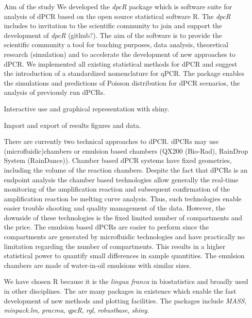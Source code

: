 \documentclass{bioinfo}
\begin{document}
Aim of the study
We developed the \textit{dpcR} package which is software suite for analysis of dPCR based on the open source statistical software R. The \textit{dpcR} includes to invitation to the scientific community to join and support the development of \textit{dpcR} (github?). The aim of the software is to provide the scientific community a tool for teaching purposes, data analysis, theoretical research (simulation) and to accelerate the development of new approaches to dPCR. We implemented all existing statistical methods for dPCR and suggest the introduction of a standardized nomenclature for qPCR. The package enables the simulations and predictions of Poisson distribution for dPCR scenarios, the analysis of previously run dPCRs.

Interactive use and graphical representation with shiny.

Import and export of results figures and data.

There are currently two technical approaches to dPCR. dPCRs may use		%
(microfluidic)chambers or emulsion based chambers 
(QX200 \texttrademark (Bio-Rad), RainDrop \texttrademark System (RainDance)). 
Chamber based dPCR systems have fixed geometries, including the volume of the 
reaction chambers. Despite the fact that dPCRs is an endpoint analysis the 
chamber based technologies allow generally the real-time monitoring of the 
amplification reaction and subsequent confirmation of the amplification reaction 
be melting curve analysis. Thus, such technologies enable easier trouble 
shooting and quality management of the data. However, the downside of these 
technologies is the fixed limited number of compartments and the price. The 
emulsion based dPCRs are easier to perform since the compartments are generated 
by microfluidic technologies and have practically no limitation regarding the 
number of compartments. This results in a higher statistical power to quantify 
small differences in sample quantities. The emulsion chambers are made of 
water-in-oil emulsions with similar sizes.

We have chosen R because it is the \textit{lingua franca} in biostatistics and broadly 
used in other disciplines. The are many packages in existence which enable the 
fast development of new methods and plotting facilities. The packages include 
\textit{MASS}, \textit{minpack.lm}, \textit{pracma}, \textit{qpcR}, \textit{rgl}, \textit{robustbase}, \textit{shiny}.
\end{document}
